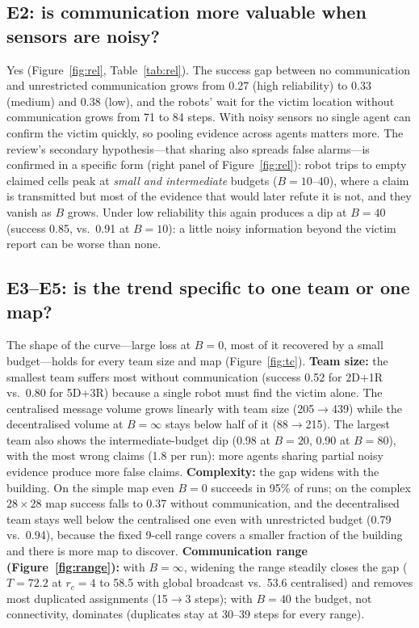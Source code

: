 \documentclass{article}
\begin{document}
\subsection{E2: is communication more valuable when sensors are noisy?}
Yes (Figure~\ref{fig:rel}, Table~\ref{tab:rel}). The success gap between no communication and unrestricted
communication grows from 0.27 (high reliability) to 0.33 (medium) and 0.38 (low), and the robots' wait for the victim
location without communication grows from 71 to 84 steps. With noisy sensors no single agent can confirm the victim
quickly, so pooling evidence across agents matters more. The review's secondary hypothesis---that sharing also spreads
false alarms---is confirmed in a specific form (right panel of Figure~\ref{fig:rel}): robot trips to empty claimed cells
peak at \emph{small and intermediate} budgets ($B=10$--$40$), where a claim is transmitted but most of the evidence that
would later refute it is not, and they vanish as $B$ grows. Under low reliability this again produces a dip at $B=40$
(success 0.85, vs.\ 0.91 at $B=10$): a little noisy information beyond the victim report can be worse than none.

\subsection{E3--E5: is the trend specific to one team or one map?}
The shape of the curve---large loss at $B=0$, most of it recovered by a small budget---holds for every team size and map
(Figure~\ref{fig:tc}). \textbf{Team size:} the smallest team suffers most without communication (success 0.52 for
2D+1R vs.\ 0.80 for 5D+3R) because a single robot must find the victim alone. The centralised message volume grows
linearly with team size (205$\to$439) while the decentralised volume at $B=\infty$ stays below half of it (88$\to$215).
The largest team also shows the intermediate-budget dip (0.98 at $B=20$, 0.90 at $B=80$), with the most wrong claims
(1.8 per run): more agents sharing partial noisy evidence produce more false claims. \textbf{Complexity:} the gap widens
with the building. On the simple map even $B=0$ succeeds in 95\% of runs; on the complex $28\times28$ map success falls to
0.37 without communication, and the decentralised team stays well below the centralised one even with unrestricted
budget (0.79 vs.\ 0.94), because the fixed 9-cell range covers a smaller fraction of the building and there is more map to
discover. \textbf{Communication range (Figure~\ref{fig:range}):} with $B=\infty$, widening the range steadily closes the
gap ($T=72.2$ at $r_c=4$ to 58.5 with global broadcast vs.\ 53.6 centralised) and removes most duplicated assignments
(15$\to$3 steps); with $B=40$ the budget, not connectivity, dominates (duplicates stay at 30--39 steps for every range).
\end{document}
